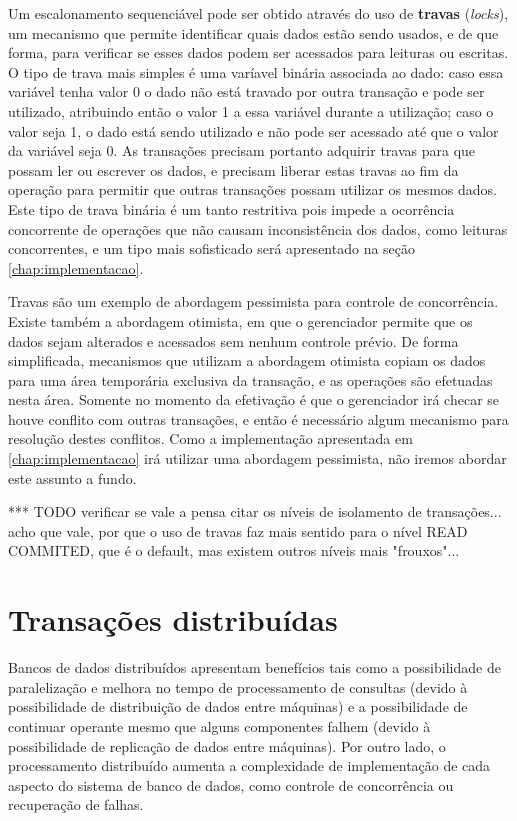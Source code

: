 \documentclass[11pt,twoside,a4paper]{book}
\begin{document}
Um escalonamento sequenciável pode ser obtido através do uso de \textbf{travas} (\emph{locks}), um mecanismo que permite identificar quais dados estão sendo usados, e de que forma, para verificar se esses dados podem ser acessados para leituras ou escritas. O tipo de trava mais simples é uma varíavel binária associada ao dado: caso essa variável tenha valor 0 o dado não está travado por outra transação e pode ser utilizado, atribuindo então o valor 1 a essa variável durante a utilização; caso o valor seja 1, o dado está sendo utilizado e não pode ser acessado até que o valor da variável seja 0. As transações precisam portanto adquirir travas para que possam ler ou escrever os dados, e precisam liberar estas travas ao fim da operação para permitir que outras transações possam utilizar os mesmos dados. Este tipo de trava binária é um tanto restritiva pois impede a ocorrência concorrente de operações que não causam inconsistência dos dados, como leituras concorrentes, e um tipo mais sofisticado será apresentado na seção \ref{chap:implementacao}.

Travas são um exemplo de abordagem pessimista para controle de concorrência. Existe também a abordagem otimista, em que o gerenciador permite que os dados sejam alterados e acessados sem nenhum controle prévio. De forma simplificada, mecanismos que utilizam a abordagem otimista copiam os dados para uma área temporária exclusiva da transação, e as operações são efetuadas nesta área. Somente no momento da efetivação é que o gerenciador irá checar se houve conflito com outras transações, e então é necessário algum mecanismo para resolução destes conflitos. Como a implementação apresentada em \ref{chap:implementacao} irá utilizar uma abordagem pessimista, não iremos abordar este assunto a fundo.

*** TODO verificar se vale a pensa citar os níveis de isolamento de transações... acho que vale, por que o uso de travas faz mais sentido para o nível READ COMMITED, que é o default, mas existem outros níveis mais "frouxos"...

\section{Transações distribuídas}
\label{sec:transacoes_distribuidas}
Bancos de dados distribuídos apresentam benefícios tais como a possibilidade de paralelização e melhora no tempo de processamento de consultas (devido à possibilidade de distribuição de dados entre máquinas) e a possibilidade de continuar operante mesmo que alguns componentes falhem (devido à possibilidade de replicação de dados entre máquinas). Por outro lado, o processamento distribuído aumenta a complexidade de implementação de cada aspecto do sistema de banco de dados, como controle de concorrência ou recuperação de falhas.
\end{document}
